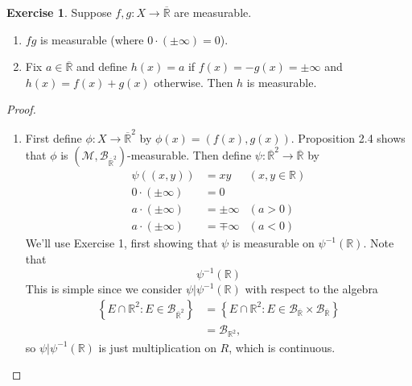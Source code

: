 \documentclass{article}
\theoremstyle{definition}
\newtheorem{ex}{Exercise}
\begin{document}
\begin{ex}
	Suppose $f, g : X \to \overline{\mathbb{R}}$ are measurable.
	\begin{enumerate}[label=\textbf{\alph*.}]
		\item $fg$ is measurable (where $0 \cdot (\pm \infty) = 0$).
		\item Fix $a \in \overline{\mathbb{R}}$ and define $h(x) = a$ if $f(x) = -g(x) = \pm \infty$ and $h(x) = f(x) + g(x)$ otherwise.
		      Then $h$ is measurable.
	\end{enumerate}
\end{ex}
\begin{proof}
	\begin{enumerate}[label=\textbf{\alph*.}]
		\item First define $\phi: X \to \overline{\mathbb{R}}^2$ by $\phi(x) = (f(x), g(x))$.
		      Proposition 2.4 shows that $\phi$ is $(\mathscr{M}, \mathscr{B}_{\overline{\mathbb{R}}^2})$-measurable.
		      Then define $\psi: \overline{\mathbb{R}}^2 \to \overline{\mathbb{R}}$ by \begin{align*}
			      \psi((x, y))         & = xy         & (x, y \in \mathbb{R}) \\
			      0 \cdot (\pm \infty) & = 0                                  \\
			      a \cdot (\pm \infty) & = \pm \infty & (a > 0)               \\
			      a \cdot (\pm \infty) & = \mp \infty & (a < 0)
		      \end{align*}
		      We'll use Exercise 1, first showing that $\psi$ is measurable on $\psi^{-1}(\mathbb{R})$.
          Note that \begin{equation*}
            \psi^{-1}(\mathbb{R})
          \end{equation*}
          This is simple since we consider $\psi|\psi^{-1}(\mathbb{R})$ with respect to the algebra \begin{align*}
			      \left\lbrace E \cap \mathbb{R}^2 : E \in \mathscr{B}_{\overline{\mathbb{R}}^2} \right\rbrace & = \left\lbrace E \cap \mathbb{R}^2 : E \in \mathscr{B}_{\overline{\mathbb{R}}} \times \mathscr{B}_{\overline{\mathbb{R}}} \right\rbrace \\
			                                                                                                   & = \mathscr{B}_{\mathbb{R}^2},
		      \end{align*}
          so $\psi|\psi^{-1}(\mathbb{R})$ is just multiplication on $R$, which is continuous.


\end{enumerate}
\end{proof}
\end{document}
